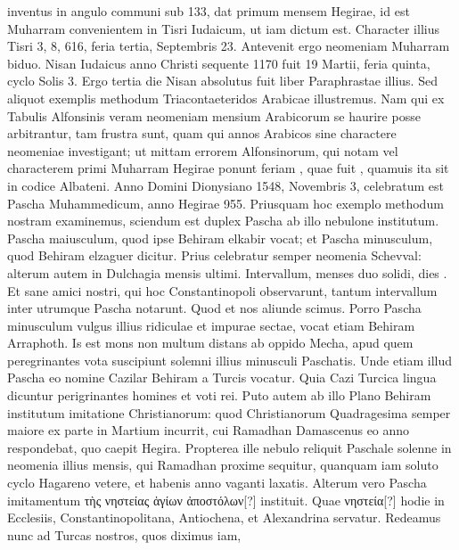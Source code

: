 inventus in angulo communi sub 133, dat primum mensem Hegirae,
id est Muharram convenientem in Tisri Iudaicum, ut iam dictum est.
Character illius Tisri 3, 8, 616, feria tertia, Septembris 23.
Antevenit ergo neomeniam Muharram biduo.
Nisan Iudaicus anno Christi
sequente 1170 fuit 19 Martii, feria quinta, cyclo Solis 3.
Ergo tertia
die Nisan absolutus fuit liber Paraphrastae illius.
Sed aliquot exemplis
methodum Triacontaeteridos Arabicae illustremus.
Nam qui ex
Tabulis Alfonsinis veram neomeniam mensium Arabicorum se haurire
posse arbitrantur, tam frustra sunt, quam qui annos Arabicos sine
charactere neomeniae investigant; ut mittam errorem Alfonsinorum,
qui notam vel characterem primi Muharram Hegirae ponunt
feriam , quae fuit , quamuis ita sit in codice Albateni.
Anno Domini
Dionysiano 1548, Novembris 3, celebratum est Pascha Muhammedicum,
anno Hegirae 955.
Priusquam hoc exemplo methodum
nostram examinemus, sciendum est duplex Pascha ab illo nebulone
institutum.
Pascha maiusculum, quod ipse Behiram elkabir
vocat; et Pascha minusculum, quod Behiram elzaguer dicitur.
Prius
celebratur semper neomenia Schevval: alterum autem in  Dulchagia
mensis ultimi.
Intervallum, menses duo solidi, dies .
Et sane amici
nostri, qui hoc Constantinopoli observarunt, tantum intervallum
inter utrumque Pascha notarunt.
Quod et nos aliunde scimus.
Porro Pascha minusculum vulgus illius ridiculae et impurae sectae,
vocat etiam Behiram Arraphoth.
Is est mons non multum distans
ab oppido Mecha, apud quem peregrinantes vota suscipiunt solemni
illius minusculi Paschatis.
Unde etiam illud Pascha eo nomine Cazilar
Behiram a Turcis vocatur.
Quia Cazi Turcica lingua dicuntur
perigrinantes homines et voti rei.
Puto autem ab illo Plano Behiram
institutum imitatione Christianorum: quod Christianorum
Quadragesima semper maiore ex parte in Martium incurrit, cui Ramadhan
Damascenus eo anno respondebat, quo caepit Hegira.
Propterea
ille nebulo reliquit Paschale solenne in neomenia illius mensis,
qui Ramadhan proxime sequitur, quanquam iam soluto cyclo Hagareno
vetere, et habenis anno vaganti laxatis.
Alterum vero Pascha imitamentum
\textgreek{τὴς νηστείας ἁγίων ἀποστόλων[?]} instituit.
Quae \textgreek{νηστεία[?]} hodie in Ecclesiis,
Constantinopolitana, Antiochena, et Alexandrina servatur.
%
Redeamus nunc ad Turcas nostros, quos diximus iam,
